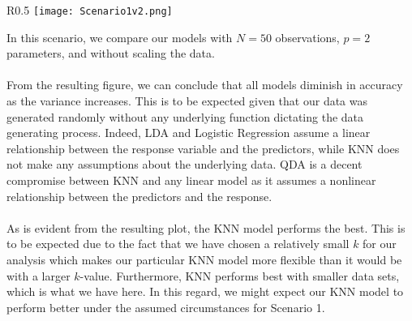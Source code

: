 \documentclass[11pt, oneside]{article}
\begin{document}
\begin{wrapfigure}[]{R}{0.5\textwidth}
\vspace{-0.55cm}
\texttt{[image: Scenario1v2.png]}
\vspace{-.55cm}
\end{wrapfigure}
In this scenario, we compare our models with $N=50$ observations, $p=2$ parameters, and without scaling the data.\\
\\
From the resulting figure, we can conclude that all models diminish in accuracy as the variance increases. This is to be expected given that our data was generated randomly without any underlying function dictating the data generating process. Indeed, LDA and Logistic Regression assume a linear relationship between the response variable and the predictors, while KNN does not make any assumptions about the underlying data. QDA is a decent compromise between KNN and any linear model as it assumes a nonlinear relationship between the predictors and the response.\\
\\
As is evident from the resulting plot, the KNN model performs the best. This is to be expected due to the fact that we have chosen a relatively small $k$ for our analysis which makes our particular KNN model more flexible than it would be with a larger $k$-value. Furthermore, KNN performs best with smaller data sets, which is what we have here. In this regard, we might expect our KNN model to perform better under the assumed circumstances for Scenario 1.\\
\\
\end{document}

